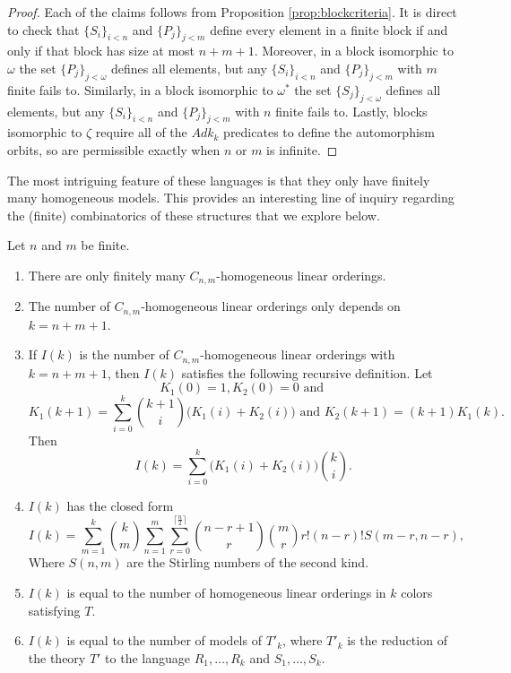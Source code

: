\documentclass[11pt]{amsart}
\theoremstyle{definition}
\begin{document}
\begin{proof}
    Each of the claims follows from Proposition \ref{prop:blockcriteria}.
    It is direct to check that $\{S_i\}_{i<n}$ and $\{P_j\}_{j<m}$ define every element in a finite block if and only if that block has size at most $n+m+1$.
    Moreover, in a block isomorphic to $\omega$ the set $\{P_j\}_{j<\omega}$ defines all elements, but any $\{S_i\}_{i<n}$ and $\{P_j\}_{j<m}$ with $m$ finite fails to.
    Similarly, in a block isomorphic to $\omega^*$ the set $\{S_j\}_{j<\omega}$ defines all elements, but any $\{S_i\}_{i<n}$ and $\{P_j\}_{j<m}$ with $n$ finite fails to.
    Lastly, blocks isomorphic to $\zeta$ require all of the $Adk_k$ predicates to define the automorphism orbits, so are permissible exactly when $n$ or $m$ is infinite.
\end{proof}

The most intriguing feature of these languages is that they only have finitely many homogeneous models.
This provides an interesting line of inquiry regarding the (finite) combinatorics of these structures that we explore below.


\begin{theorem}
Let $n$ and $m$ be finite.
\begin{enumerate}
    \item There are only finitely many $C_{n,m}$-homogeneous linear orderings.
    \item The number of $C_{n,m}$-homogeneous linear orderings only depends on $k=n+m+1$.
    \item If $I(k)$ is the number of $C_{n,m}$-homogeneous linear orderings with $k=n+m+1$, then $I(k)$ satisfies the following recursive definition.
    Let
    \[K_1(0)=1,K_2(0)=0 \text{ and }\] 
    \[K_1(k+1)= \sum_{i=0}^{k} {k+1 \choose i} \big(K_1(i)+K_2(i)\big) \text{ and } K_2(k+1)=(k+1)K_1(k).\]
    Then
    \[I(k)=\sum_{i=0}^{k} \big(K_1(i)+K_2(i)\big) {k \choose i}.\]
    \item $I(k)$ has the closed form
    \[I(k)=\sum_{m=1}^k{k \choose m}\sum_{n=1}^m\sum_{r=0}^{\lceil \frac{n}2 \rceil}{n-r+1 \choose r}{m \choose r}r!(n-r)!S(m-r,n-r),\]
    Where $S(n,m)$ are the Stirling numbers of the second kind.
    \item $I(k)$ is equal to the number of homogeneous linear orderings in $k$ colors satisfying $T$.
    \item $I(k)$ is equal to the number of models of $T'_k$, where $T'_k$ is the reduction of the theory $T'$ to the language $R_1,\dots,R_k$ and $S_1,\dots,S_k$.
\end{enumerate}
     
\end{theorem}
\end{document}
